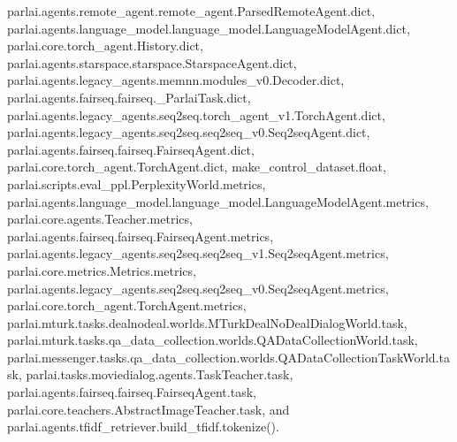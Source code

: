 parlai.\+agents.\+remote\+\_\+agent.\+remote\+\_\+agent.\+Parsed\+Remote\+Agent.\+dict, parlai.\+agents.\+language\+\_\+model.\+language\+\_\+model.\+Language\+Model\+Agent.\+dict, parlai.\+core.\+torch\+\_\+agent.\+History.\+dict, parlai.\+agents.\+starspace.\+starspace.\+Starspace\+Agent.\+dict, parlai.\+agents.\+legacy\+\_\+agents.\+memnn.\+modules\+\_\+v0.\+Decoder.\+dict, parlai.\+agents.\+fairseq.\+fairseq.\+\_\+\+Parlai\+Task.\+dict, parlai.\+agents.\+legacy\+\_\+agents.\+seq2seq.\+torch\+\_\+agent\+\_\+v1.\+Torch\+Agent.\+dict, parlai.\+agents.\+legacy\+\_\+agents.\+seq2seq.\+seq2seq\+\_\+v0.\+Seq2seq\+Agent.\+dict, parlai.\+agents.\+fairseq.\+fairseq.\+Fairseq\+Agent.\+dict, parlai.\+core.\+torch\+\_\+agent.\+Torch\+Agent.\+dict, make\+\_\+control\+\_\+dataset.\+float, parlai.\+scripts.\+eval\+\_\+ppl.\+Perplexity\+World.\+metrics, parlai.\+agents.\+language\+\_\+model.\+language\+\_\+model.\+Language\+Model\+Agent.\+metrics, parlai.\+core.\+agents.\+Teacher.\+metrics, parlai.\+agents.\+fairseq.\+fairseq.\+Fairseq\+Agent.\+metrics, parlai.\+agents.\+legacy\+\_\+agents.\+seq2seq.\+seq2seq\+\_\+v1.\+Seq2seq\+Agent.\+metrics, parlai.\+core.\+metrics.\+Metrics.\+metrics, parlai.\+agents.\+legacy\+\_\+agents.\+seq2seq.\+seq2seq\+\_\+v0.\+Seq2seq\+Agent.\+metrics, parlai.\+core.\+torch\+\_\+agent.\+Torch\+Agent.\+metrics, parlai.\+mturk.\+tasks.\+dealnodeal.\+worlds.\+M\+Turk\+Deal\+No\+Deal\+Dialog\+World.\+task, parlai.\+mturk.\+tasks.\+qa\+\_\+data\+\_\+collection.\+worlds.\+Q\+A\+Data\+Collection\+World.\+task, parlai.\+messenger.\+tasks.\+qa\+\_\+data\+\_\+collection.\+worlds.\+Q\+A\+Data\+Collection\+Task\+World.\+task, parlai.\+tasks.\+moviedialog.\+agents.\+Task\+Teacher.\+task, parlai.\+agents.\+fairseq.\+fairseq.\+Fairseq\+Agent.\+task, parlai.\+core.\+teachers.\+Abstract\+Image\+Teacher.\+task, and parlai.\+agents.\+tfidf\+\_\+retriever.\+build\+\_\+tfidf.\+tokenize().

